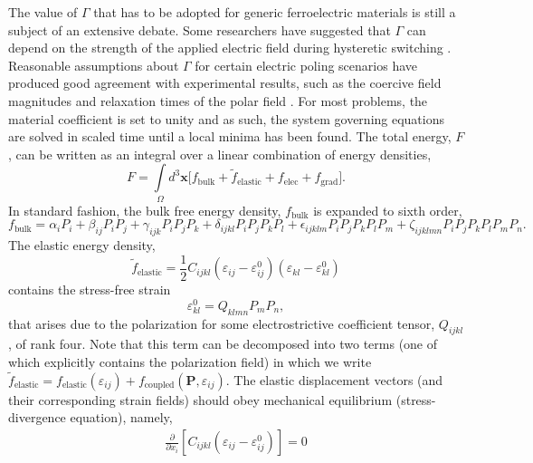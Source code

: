 \documentclass[22pt]{article} %
\begin{document}
%
The value of $\Gamma$ that has to be adopted for generic ferroelectric materials is still a subject of an extensive debate. Some researchers have suggested that $\Gamma$ can depend on the strength of the applied electric field during hysteretic switching \cite{Meng2015}.
%
Reasonable assumptions about $\Gamma$ for certain electric poling scenarios have produced good agreement with experimental results, such as the coercive field magnitudes and relaxation times of the polar field \cite{Fridkin2000, Hlinka2007}.
%
For most problems, the material coefficient is set to unity and as such, the system governing equations are solved in scaled time until a local minima has been found.
%
The total energy, $F$, can be written as an integral over a linear combination of energy densities,
%
$$F = \int\limits_\Omega d^3 \textbf{x} \Bigg[f_\mathrm{bulk} + \widetilde{f}_\mathrm{elastic} + f_\mathrm{elec} + f_\mathrm{grad} \Bigg].$$
%
In standard fashion, the bulk free energy density, $f_\mathrm{bulk}$ is expanded to sixth order,
%
$$f_\mathrm{bulk} = \alpha_{i} P_i + \beta_{ij} P_i P_j + \gamma_{ijk} P_i P_j P_k + \delta_{ijkl} P_i P_j P_k P_l  + \epsilon_{ijklm} P_i P_j P_k P_l P_m + \zeta_{ijklmn} P_i P_j P_k P_l P_m P_n.$$
%
The elastic energy density, 
%
$$\widetilde{f}_\mathrm{elastic} = \frac{1}{2} C_{ijkl} \left(\varepsilon_{ij} - \varepsilon_{ij}^0 \right) \left(\varepsilon_{kl} - \varepsilon_{kl}^0 \right) $$
%
contains the stress-free strain
%
$$\varepsilon_{kl}^0 = Q_{klmn} P_m P_n,$$
%
that arises due to the polarization for some electrostrictive coefficient tensor, $Q_{ijkl}$, of rank four. 
%
Note that this term can be decomposed into two terms (one of which explicitly contains the polarization field) in which we write $\widetilde{f}_\mathrm{elastic} = f_\mathrm{elastic}( \varepsilon_{ij}) + f_\mathrm{coupled}(\textbf{P}, \varepsilon_{ij})$.
%
The elastic displacement vectors (and their corresponding strain fields) should obey mechanical equilibrium (stress-divergence equation), namely,
%
\begin{align}\nonumber
\frac{\partial}{\partial x_i} \left[C_{ijkl} \left(\varepsilon_{ij} -  \varepsilon_{ij}^0 \right)\right] = 0
\end{align}
\end{document}
